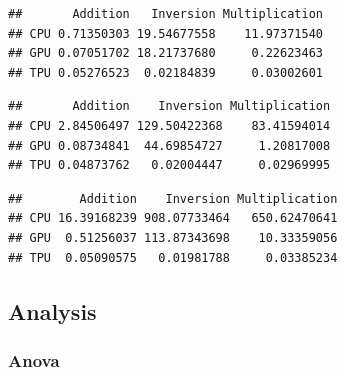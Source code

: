 \documentclass[
]{article}
\newenvironment{Shaded}{\begin{snugshade}}{\end{snugshade}}
\newcommand{\CommentTok}[1]{\textcolor[rgb]{0.56,0.35,0.01}{\textit{#1}}}
\newcommand{\KeywordTok}[1]{\textcolor[rgb]{0.13,0.29,0.53}{\textbf{#1}}}
\newcommand{\NormalTok}[1]{#1}
\newcommand{\OperatorTok}[1]{\textcolor[rgb]{0.81,0.36,0.00}{\textbf{#1}}}
\begin{document}
\begin{verbatim}
##       Addition   Inversion Multiplication
## CPU 0.71350303 19.54677558    11.97371540
## GPU 0.07051702 18.21737680     0.22623463
## TPU 0.05276523  0.02184839     0.03002601
\end{verbatim}

\begin{Shaded}
\end{Shaded}

\begin{verbatim}
##       Addition    Inversion Multiplication
## CPU 2.84506497 129.50422368    83.41594014
## GPU 0.08734841  44.69854727     1.20817008
## TPU 0.04873762   0.02004447     0.02969995
\end{verbatim}

\begin{Shaded}
\end{Shaded}

\begin{verbatim}
##        Addition    Inversion Multiplication
## CPU 16.39168239 908.07733464   650.62470641
## GPU  0.51256037 113.87343698    10.33359056
## TPU  0.05090575   0.01981788     0.03385234
\end{verbatim}

\hypertarget{analysis}{%
\subsection{Analysis}\label{analysis}}

\hypertarget{anova}{%
\subsubsection{Anova}\label{anova}}
\end{document}
